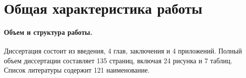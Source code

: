 
\section*{Общая характеристика работы}



\paragraph*{Объем и структура работы.}
Диссертация состоит из введения,
4 глав,
заключения и 4 приложений.
Полный объем диссертации составляет
135 страниц,
включая 24 рисунка и 7 таблиц.
Список литературы содержит 121 наименование.
